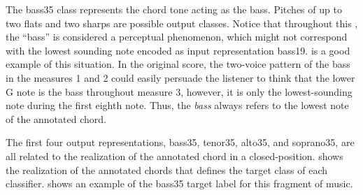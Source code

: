 
The \gls{bass35} class represents the chord tone acting as
the bass. Pitches of up to two flats and two sharps are
possible output classes. Notice that throughout this
\thesisdiss{}, the ``bass'' is considered a perceptual
phenomenon, which might not correspond with the lowest
sounding note encoded as input representation \gls{bass19}.
 is a good example of this situation.
In the original score, the two-voice pattern of the bass in
the measures 1 and 2 could easily persuade the listener to
think that the lower G note is the bass throughout measure
3, however, it is only the lowest-sounding note during the
first eighth note. Thus, the \emph{bass} always refers to
the lowest note of the annotated chord.

The first four output representations, \gls{bass35},
\gls{tenor35}, \gls{alto35}, and \gls{soprano35}, are all
related to the realization of the annotated chord in a
\gls{closed-position}.  shows the
realization of the annotated chords that defines the target
class of each classifier.  shows an
example of the \gls{bass35} target label for this fragment
of music.




